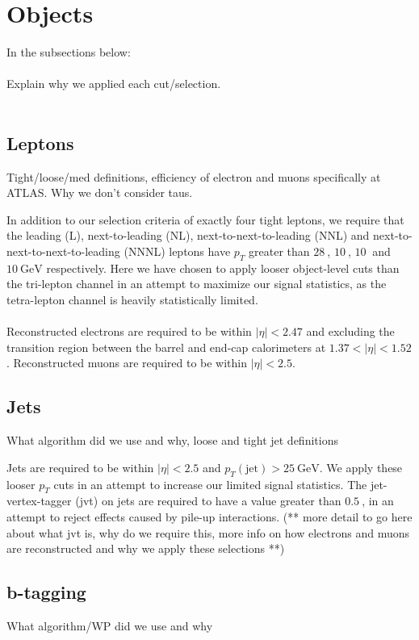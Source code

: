 \section{Objects}
In the subsections below:\\\\
Explain why we applied each cut/selection.\\\\


\subsection{Leptons}
Tight/loose/med definitions, efficiency of electron and muons specifically at ATLAS. Why we don't consider taus.


In addition to our selection criteria of exactly four tight leptons, we require that the leading (L), next-to-leading (NL), next-to-next-to-leading (NNL) and next-to-next-to-next-to-leading (NNNL) leptons have $p_{T}$ greater than $\SI{28}{}$, $\SI{10}{}$, $\SI{10}{}$ and $\SI{10}{\GeV}$ respectively. Here we have chosen to apply looser object-level cuts than the tri-lepton channel in an attempt to maximize our signal statistics, as the tetra-lepton channel is heavily statistically limited.\\\\
Reconstructed electrons are required to be within $|\eta| < 2.47$ and excluding the transition region between the barrel and end-cap calorimeters at $1.37 < |\eta| < 1.52$. Reconstructed muons are required to be within $|\eta| < 2.5$.
\subsection{Jets}
What algorithm did we use and why, loose and tight jet definitions

Jets are required to be within $|\eta| < 2.5$ and $p_{T}(\text{jet}) > \SI{25}{\GeV}$. We apply these looser $p_T$ cuts in an attempt to increase our limited signal statistics. The jet-vertex-tagger (jvt) on jets are required to have a value greater than $\SI{0.5}{}$, in an attempt to reject effects caused by pile-up interactions. (** more detail to go here about what jvt is, why do we require this, more info on how electrons and muons are reconstructed and why we apply these selections **)



\subsection{b-tagging}
What algorithm/WP did we use and why
